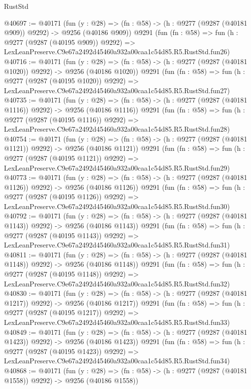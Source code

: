 \begin{lexlean}{RustStd}
\begin{coremodule}
@40697 := @40171
    (fun (y : @28) => (fn : @58) -> (h : @9277 (@9287 (@40181 @909)) @9292) -> @9256 (@40186 @909))
    @9291
    (fun (fn : @58) =>
    fun (h : @9277 (@9287 (@40195 @909)) @9292) =>
    LexLeanPreserve.C9e67a2492d45460a932a00caa1c54d85.R5.RustStd.fun26)
@40716 := @40171
    (fun (y : @28) =>
    (fn : @58) -> (h : @9277 (@9287 (@40181 @1020)) @9292) -> @9256 (@40186 @1020))
    @9291
    (fun (fn : @58) =>
    fun (h : @9277 (@9287 (@40195 @1020)) @9292) =>
    LexLeanPreserve.C9e67a2492d45460a932a00caa1c54d85.R5.RustStd.fun27)
@40735 := @40171
    (fun (y : @28) =>
    (fn : @58) -> (h : @9277 (@9287 (@40181 @1116)) @9292) -> @9256 (@40186 @1116))
    @9291
    (fun (fn : @58) =>
    fun (h : @9277 (@9287 (@40195 @1116)) @9292) =>
    LexLeanPreserve.C9e67a2492d45460a932a00caa1c54d85.R5.RustStd.fun28)
@40754 := @40171
    (fun (y : @28) =>
    (fn : @58) -> (h : @9277 (@9287 (@40181 @1121)) @9292) -> @9256 (@40186 @1121))
    @9291
    (fun (fn : @58) =>
    fun (h : @9277 (@9287 (@40195 @1121)) @9292) =>
    LexLeanPreserve.C9e67a2492d45460a932a00caa1c54d85.R5.RustStd.fun29)
@40773 := @40171
    (fun (y : @28) =>
    (fn : @58) -> (h : @9277 (@9287 (@40181 @1126)) @9292) -> @9256 (@40186 @1126))
    @9291
    (fun (fn : @58) =>
    fun (h : @9277 (@9287 (@40195 @1126)) @9292) =>
    LexLeanPreserve.C9e67a2492d45460a932a00caa1c54d85.R5.RustStd.fun30)
@40792 := @40171
    (fun (y : @28) =>
    (fn : @58) -> (h : @9277 (@9287 (@40181 @1143)) @9292) -> @9256 (@40186 @1143))
    @9291
    (fun (fn : @58) =>
    fun (h : @9277 (@9287 (@40195 @1143)) @9292) =>
    LexLeanPreserve.C9e67a2492d45460a932a00caa1c54d85.R5.RustStd.fun31)
@40811 := @40171
    (fun (y : @28) =>
    (fn : @58) -> (h : @9277 (@9287 (@40181 @1148)) @9292) -> @9256 (@40186 @1148))
    @9291
    (fun (fn : @58) =>
    fun (h : @9277 (@9287 (@40195 @1148)) @9292) =>
    LexLeanPreserve.C9e67a2492d45460a932a00caa1c54d85.R5.RustStd.fun32)
@40830 := @40171
    (fun (y : @28) =>
    (fn : @58) -> (h : @9277 (@9287 (@40181 @1217)) @9292) -> @9256 (@40186 @1217))
    @9291
    (fun (fn : @58) =>
    fun (h : @9277 (@9287 (@40195 @1217)) @9292) =>
    LexLeanPreserve.C9e67a2492d45460a932a00caa1c54d85.R5.RustStd.fun33)
@40849 := @40171
    (fun (y : @28) =>
    (fn : @58) -> (h : @9277 (@9287 (@40181 @1423)) @9292) -> @9256 (@40186 @1423))
    @9291
    (fun (fn : @58) =>
    fun (h : @9277 (@9287 (@40195 @1423)) @9292) =>
    LexLeanPreserve.C9e67a2492d45460a932a00caa1c54d85.R5.RustStd.fun34)
@40868 := @40171
    (fun (y : @28) =>
    (fn : @58) -> (h : @9277 (@9287 (@40181 @1558)) @9292) -> @9256 (@40186 @1558))

\end{coremodule}
\end{lexlean}
